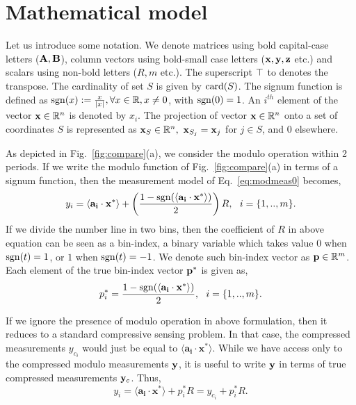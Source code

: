 \section{Mathematical model}
\label{sec:model}
Let us introduce some notation. We denote matrices using bold capital-case letters ($\mathbf{A,B}$), column vectors using bold-small case letters ($\mathbf{x,y,z}$ etc.) and scalars using non-bold letters ($R,m$ etc.). The superscript $\top$ to denotes the transpose. The cardinality of set $S$ is given by $\mathrm{card}(S)$. The signum function is defined as $\mathrm{sgn}(x) := \frac{x}{|x|}, \forall x \in {\mathbb{R}}, x \neq 0$, with $\mathrm{sgn}(0)=1$. An $i^{th}$ element of the vector $\mathbf{x} \in {\mathbb{R}}^n$ is denoted by $x_{i}$.%
The projection of vector $\mathbf{x} \in {\mathbb{R}}^n$ onto a set of coordinates $S$ is represented as $\mathbf{x}_S \in {\mathbb{R}}^n,~\mathbf{x}_{S_j} = \mathbf{x}_j$ for $j \in S$, and $0$ elsewhere.

As depicted in Fig.~\ref{fig:compare}(a), we consider the modulo operation within 2 periods.
If we write the modulo function of Fig.~\ref{fig:compare}(a) in terms of a signum function, then the measurement model of Eq.~\ref{eq:modmeas0} becomes, 
\begin{equation}
y_i= \langle \mathbf{a_i} \cdot \mathbf{x^*} \rangle+\left( \frac{1-\mathrm{sgn}(\langle \mathbf{a_i} \cdot \mathbf{x^*} \rangle)}{2}\right)R,~~i = \{1,..,m\}.
\label{eq:modmeas2}
\end{equation} 
If we divide the number line in two bins, then the coefficient of $R$ in above equation can be seen as a bin-index, a binary variable which takes value $0$ when $\mathrm{sgn}(t)=1$, or $1$ when $\mathrm{sgn}(t)=-1$. We denote such bin-index vector as $\mathbf{p} \in {\mathbb{R}}^m$. Each element of the true bin-index vector $\mathbf{p}^*$ is given as,
$$
p^*_i = \frac{1-\mathrm{sgn}(\langle \mathbf{a_i} \cdot \mathbf{x^*} \rangle)}{2},~~i = \{1,..,m\}.
$$

If we ignore the presence of modulo operation in above formulation, then it reduces to a standard compressive sensing problem. In that case, the compressed measurements $y_{c_i}$ would just be equal to $\langle \mathbf{a_i} \cdot \mathbf{x^*} \rangle$. While we have access only to the compressed modulo measurements $\mathbf{y}$, it is useful to write $\mathbf{y}$ in terms of true compressed measurements $\mathbf{y}_c$. Thus,
$$
y_i = \langle \mathbf{a_i} \cdot \mathbf{x^*} \rangle + p^*_iR = y_{c_i}+p^*_iR.
$$

